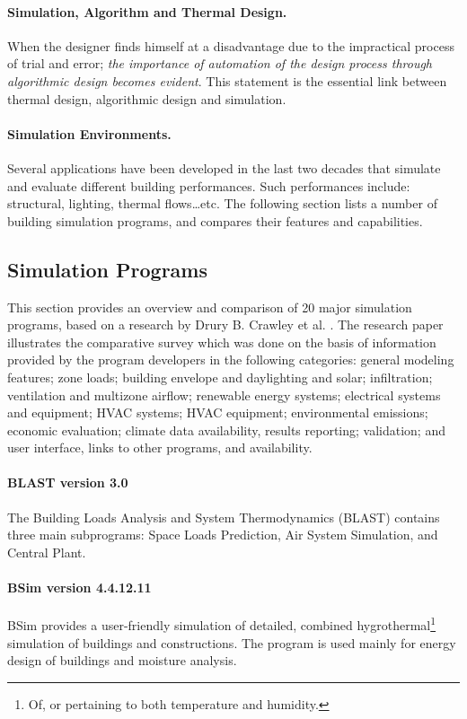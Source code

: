 \paragraph{Simulation, Algorithm and Thermal Design.} When the designer finds himself at a disadvantage due to the impractical process of trial and error; \emph{the importance of automation of the design process through algorithmic design becomes evident}. This statement is the essential link between thermal design, algorithmic design and simulation.

\paragraph{Simulation Environments.} Several applications have been developed in the last two decades that simulate and evaluate different building performances. Such performances include: structural, lighting, thermal flows\ldots etc. The following section lists a number of building simulation programs, and compares their features and capabilities.

\newpage
\subsection{Simulation Programs}
\label{sec:SimulationPrograms}

This section provides an overview and comparison of 20 major simulation programs, based on a research by Drury B. Crawley et al. \cite{crawley05}. The research paper illustrates the comparative survey which was done on the basis of information provided by the program developers in the following categories: general modeling features; zone loads; building envelope and daylighting and solar; infiltration; ventilation and multizone airflow; renewable energy systems; electrical systems and equipment; HVAC systems; HVAC equipment; environmental emissions; economic evaluation; climate data availability, results reporting; validation; and user interface, links to other programs, and availability.

\paragraph{BLAST version 3.0} The Building Loads Analysis and System Thermodynamics (BLAST) contains three main subprograms: Space Loads Prediction, Air System Simulation, and Central Plant.

\paragraph{BSim version 4.4.12.11} BSim provides a user-friendly simulation of detailed, combined hygrothermal\footnote{Of, or pertaining to both temperature and humidity.} simulation of buildings and constructions. The program is used mainly for energy design of buildings and moisture analysis.

